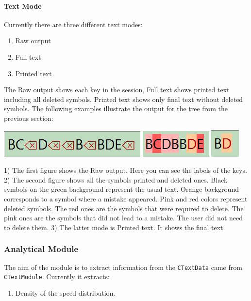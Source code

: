 \documentclass{article}
\begin{document}
\paragraph{Text Mode}

Currently there are three different text modes:
\begin{enumerate}
\item Raw output
\item Full text
\item Printed text
\end{enumerate}
The Raw output shows each key in the session, Full text shows printed text including all deleted symbols, Printed text shows only final text without deleted symbols. The following examples illustrate the output for the tree from the previous section:
\begin{center}
\includegraphics[scale = 0.6]{Figures/raw_session.jpg}
\quad
\includegraphics[scale = 0.6]{Figures/full_text.jpg}
\quad
\includegraphics[scale = 0.6]{Figures/printed_text.jpg}

1) The first figure shows the Raw output. Here you can see the labels of the keys. 2) The second figure shows all the symbols printed and deleted ones. Black symbols on the green background represent the usual text. Orange background corresponds to a symbol where a mistake appeared. Pink and red colors represent deleted symbols. The red ones are the symbols that were required to delete. The pink ones are the symbols that did not lead to a mistake. The user did not need to delete them. 3) The latter mode is Printed text. It shows the final text.
\end{center}

\subsubsection{Analytical Module}

The aim of the module is to extract information from the \verb"CTextData" came from \verb"CTextModule". Currently it extracts:
\begin{enumerate}
\item Density of the speed distribution.
\end{enumerate}
\end{document}
